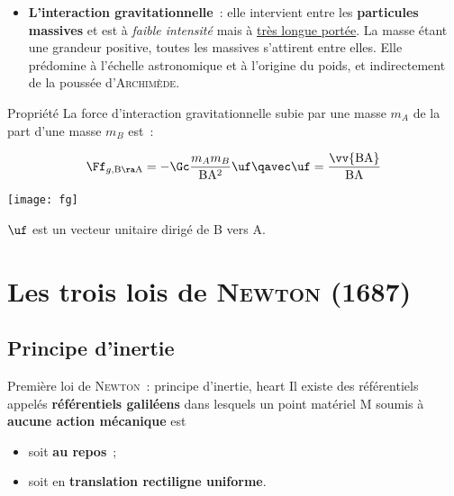 \documentclass[../main/main.tex]{subfiles}
\begin{document}
\begin{itemize}
    \item \textbf{L'interaction gravitationnelle}~: elle intervient entre les
        \textbf{particules massives} et est à \textit{faible intensité} mais à
        \ul{très longue portée}. La masse étant une grandeur positive, toutes
        les massives s'attirent entre elles. Elle prédomine à l'échelle
        astronomique et à l'origine du poids, et indirectement de la poussée
        d'\textsc{Archimède}.
\end{itemize}
\begin{tprop}{Propriété}
    La force d'interaction gravitationnelle subie par une masse
    $m_A$ de la part d'une masse $m_B$ est~: \smallbreak
    \begin{minipage}{0.45\linewidth}
        \[\Ff_{g,\rm B\ra A} = -\Gc \frac{m_Am_B}{\rm BA^2}\uf
        \qavec
        \uf = \frac{\vv{\rm BA}}{\rm BA}\]
    \end{minipage}
    \hfill
    \begin{minipage}{0.45\linewidth}
        \begin{center}
            \texttt{[image: fg]}
        \end{center}
    \end{minipage}

    \bigbreak$\uf$ est un vecteur unitaire dirigé de B vers A.
\end{tprop}

\section{Les trois lois de \textsc{Newton} (1687)}
\subsection{Principe d'inertie}

\begin{tprop}
    {Première loi de \textsc{Newton}~: principe d'inertie, heart}
    Il existe des référentiels appelés \textbf{référentiels galiléens} dans lesquels un
    point matériel M soumis à \textbf{aucune action mécanique} est
    \begin{itemize}
        \item soit \textbf{au repos}~;
        \item soit en \textbf{translation rectiligne uniforme}.
    \end{itemize}
\end{tprop}
\end{document}
